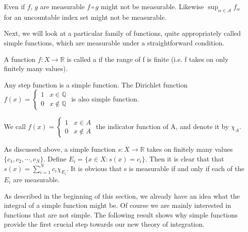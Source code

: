 \documentclass[11pt]{scrartcl}
\begin{document}
\begin{remark}
Even if $f$, $g$ are measurable $f \circ g$ might not be measurable. Likewise $\sup_{\alpha \in \mathscr{A}} f_\alpha $ for an uncountable index set might not be measurable.
\end{remark}

Next, we will look at a particular family of functions, quite appropriately called simple functions, which are measurable under a straightforward condition.

\begin{definition} A function $f: X \rightarrow \mathbb{R}$ is called a  if the range of f is finite (i.e. f takes on only finitely many values).
\end{definition}

\begin{example}
Any step function is a simple function. The Dirichlet function $f(x) = \begin{cases}
1 & x \in \mathbb{Q} \\
0 & x \notin \mathbb{Q} 
\end{cases}$ is also simple function.
\end{example}

\begin{definition}
We call $f(x) = \begin{cases}
1 & x \in A \\
0 & x \notin A 
\end{cases}$ the indicator function of A, and denote it by $\chi_A$.
\end{definition}

\begin{remark}
As discussed above, a simple function $s: X \rightarrow \mathbb{R}$ takes on finitely many values $\{c_1, c_2, \cdots, c_N\}$. Define $E_i = \{x\in X: s(x) = c_i\}$. Then it is clear that that $s(x) = \sum_{i=1}^N c_i \chi_{E_i}$. It is obvious that s is measurable if and only if each of the $E_i$ are measurable.
\end{remark}

As described in the beginning of this section, we already have an idea what the integral of a simple function might be. Of course we are mainly interested in functions that are not simple. The following result shows why simple functions provide the first crucial step towards our new theory of integration.
\end{document}
